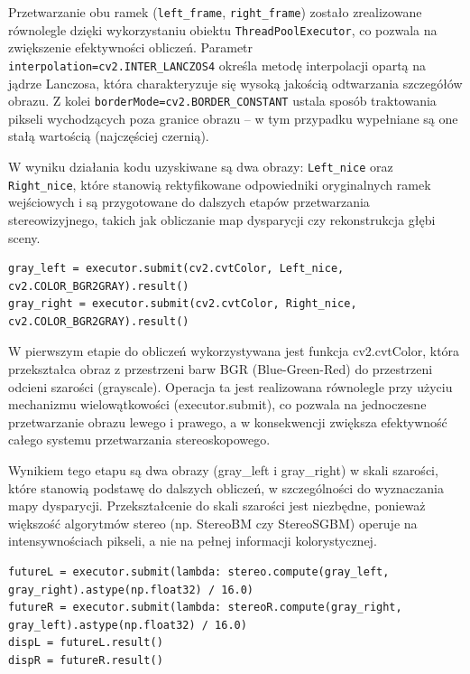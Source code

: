 \documentclass[magisterska]{pracadypl}
\begin{document}
Przetwarzanie obu ramek (\texttt{left\_frame}, \texttt{right\_frame}) zostało zrealizowane równolegle dzięki wykorzystaniu obiektu \texttt{ThreadPoolExecutor}, co pozwala na zwiększenie efektywności obliczeń. Parametr \texttt{interpolation=cv2.INTER\_LANCZOS4} określa metodę interpolacji opartą na jądrze Lanczosa, która charakteryzuje się wysoką jakością odtwarzania szczegółów obrazu. Z kolei \texttt{borderMode=cv2.BORDER\_CONSTANT} ustala sposób traktowania pikseli wychodzących poza granice obrazu – w tym przypadku wypełniane są one stałą wartością (najczęściej czernią).  

W wyniku działania kodu uzyskiwane są dwa obrazy: \texttt{Left\_nice} oraz \texttt{Right\_nice}, które stanowią rektyfikowane odpowiedniki oryginalnych ramek wejściowych i są przygotowane do dalszych etapów przetwarzania stereowizyjnego, takich jak obliczanie map dysparycji czy rekonstrukcja głębi sceny.

\begin{lstlisting}[style=mypython]
gray_left = executor.submit(cv2.cvtColor, Left_nice, cv2.COLOR_BGR2GRAY).result()
gray_right = executor.submit(cv2.cvtColor, Right_nice, cv2.COLOR_BGR2GRAY).result()
\end{lstlisting}

W pierwszym etapie do obliczeń wykorzystywana jest funkcja cv2.cvtColor, która przekształca obraz z przestrzeni barw BGR (Blue-Green-Red) do przestrzeni odcieni szarości (grayscale). Operacja ta jest realizowana równolegle przy użyciu mechanizmu wielowątkowości (executor.submit), co pozwala na jednoczesne przetwarzanie obrazu lewego i prawego, a w konsekwencji zwiększa efektywność całego systemu przetwarzania stereoskopowego.

Wynikiem tego etapu są dwa obrazy (gray\_left i gray\_right) w skali szarości, które stanowią podstawę do dalszych obliczeń, w szczególności do wyznaczania mapy dysparycji. Przekształcenie do skali szarości jest niezbędne, ponieważ większość algorytmów stereo (np. StereoBM czy StereoSGBM) operuje na intensywnościach pikseli, a nie na pełnej informacji kolorystycznej.

\begin{lstlisting}[style=mypython]
futureL = executor.submit(lambda: stereo.compute(gray_left, gray_right).astype(np.float32) / 16.0)
futureR = executor.submit(lambda: stereoR.compute(gray_right, gray_left).astype(np.float32) / 16.0)
dispL = futureL.result()
dispR = futureR.result()
\end{lstlisting}
\end{document}
